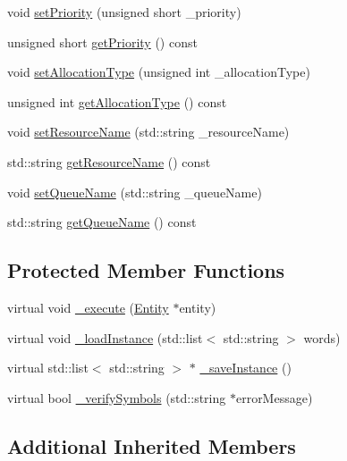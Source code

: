 \begin{DoxyCompactItemize}
\item 
void \hyperlink{class_seize_aa9c7a856ef519696526192a06dab9551}{set\-Priority} (unsigned short \-\_\-priority)
\item 
unsigned short \hyperlink{class_seize_aae382dc1d1d3dc9a3de927cc9d7811c9}{get\-Priority} () const 
\item 
void \hyperlink{class_seize_a4f6354bf4897ce4c46ff9c1e2dd5c150}{set\-Allocation\-Type} (unsigned int \-\_\-allocation\-Type)
\item 
unsigned int \hyperlink{class_seize_ac40f22e56d4448c5d5bae40b64ef4deb}{get\-Allocation\-Type} () const 
\item 
void \hyperlink{class_seize_a2bdaa616c4fd499f754099eb59729547}{set\-Resource\-Name} (std\-::string \-\_\-resource\-Name)
\item 
std\-::string \hyperlink{class_seize_a30781601e8fcfb165c99aee731c081e8}{get\-Resource\-Name} () const 
\item 
void \hyperlink{class_seize_a4d24a3326db05e92439379e1c4efa940}{set\-Queue\-Name} (std\-::string \-\_\-queue\-Name)
\item 
std\-::string \hyperlink{class_seize_a37f2b1a10e1ae390d5186a87bdebe30a}{get\-Queue\-Name} () const 
\end{DoxyCompactItemize}
\subsection*{Protected Member Functions}
\begin{DoxyCompactItemize}
\item 
virtual void \hyperlink{class_seize_a96f6517a40b3bfd0d5ea753d59cef797}{\-\_\-execute} (\hyperlink{class_entity}{Entity} $\ast$entity)
\item 
virtual void \hyperlink{class_seize_a421a0ec6382cb30f6a0342f8dea050db}{\-\_\-load\-Instance} (std\-::list$<$ std\-::string $>$ words)
\item 
virtual std\-::list$<$ std\-::string $>$ $\ast$ \hyperlink{class_seize_a38a8af6942b51ce11d191469d277661d}{\-\_\-save\-Instance} ()
\item 
virtual bool \hyperlink{class_seize_a51dc9257dc692083006f676546ddfff8}{\-\_\-verify\-Symbols} (std\-::string $\ast$error\-Message)
\end{DoxyCompactItemize}
\subsection*{Additional Inherited Members}


